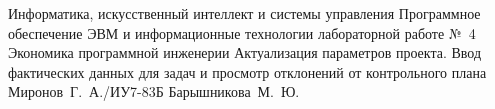 \documentclass{bmstu}
\begin{document}
\makereporttitle
    {Информатика, искусственный интеллект и системы управления}
    {Программное обеспечение ЭВМ и информационные технологии}
    {лабораторной работе №~4}
    {Экономика программной инженерии}
    {Актуализация параметров проекта. Ввод фактических данных для
задач и просмотр отклонений от контрольного плана}
    {}
    {Миронов~Г.~А./ИУ7-83Б}
    {Барышникова~М.~Ю.}




\end{document}
